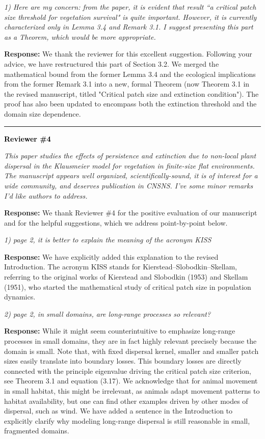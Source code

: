 \documentclass[11pt,a4paper]{article}
\newcommand{\reviewer}[1]{\vspace{1em}\noindent\textbf{\textcolor{black}{#1}}}
\newcommand{\comment}[1]{\vspace{0.5em}\noindent\textit{\textcolor{revcolor}{#1}}}
\newcommand{\response}[1]{\vspace{0.5em}\noindent\textbf{\textcolor{authorcolor}{Response:}} \textcolor{authorcolor}{#1}}
\begin{document}
\comment{1) Here are my concern: from the paper, it is evident that result ``a critical patch size threshold for vegetation survival" is quite important. However, it is currently characterized only in Lemma 3.4 and Remark 3.1. I suggest presenting this part as a Theorem, which would be more appropriate.}

\response{We thank the reviewer for this excellent suggestion.  Following your advice, we have restructured this part of Section 3.2. We merged the mathematical bound from the former Lemma 3.4 and the ecological implications from the former Remark 3.1 into a new, formal Theorem (now Theorem 3.1 in the revised manuscript, titled "Critical patch size and extinction condition"). The proof has also been updated to encompass both the extinction threshold and the domain size dependence.}

\vspace{2em}
\hrule
\vspace{2em}

\reviewer{Reviewer \#4}

\comment{This paper studies the effects of persistence and extinction due to non-local plant dispersal in the Klausmeier model for vegetation in finite-size flat environments. The manuscript appears well organized, scientifically-sound, it is of interest for a wide community, and deserves publication in CNSNS. I've some minor remarks I'd like authors to address.}

\response{We thank Reviewer \#4 for the positive evaluation of our manuscript and for the helpful suggestions, which we address point-by-point below.}

\comment{1) page 2, it is better to explain the meaning of the acronym KISS}

\response{We have explicitly added this explanation to the revised Introduction. The acronym KISS stands for Kierstead--Slobodkin--Skellam, referring to the original works of Kierstead and Slobodkin (1953) and Skellam (1951), who started the mathematical study of critical patch size in population dynamics.}

\comment{2) page 2, in small domains, are long-range processes so relevant?}

\response{While it might seem counterintuitive to emphasize long-range processes in small domains, they are in fact highly relevant precisely because the domain is small. Note that, with fixed dispersal kernel, smaller and smaller patch sizes easily translate into boundary losses. This boundary losses are directly connected with the principle eigenvalue driving the critical patch size criterion, see Theorem 3.1 and equation (3.17). We acknowledge that for animal movement in small habitat, this might be irrelevant, as animals adapt movement patterns to habitat availability, but one can find other examples driven by other modes of dispersal, such as wind. We have added a sentence in the Introduction to explicitly clarify why modeling long-range dispersal is still reasonable in small, fragmented domains.}
\end{document}
